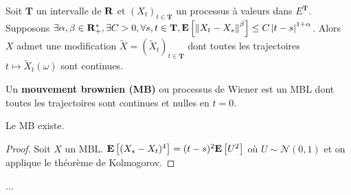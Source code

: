 	\begin{thm}[Kolmogorov]
		Soit $\mathbf{T}$ un intervalle de $\mathbf{R}$ et $(X_t)_{t \in \mathbf{T}}$ un processus à valeurs dans $E^{\mathbf{T}}$.
		Supposons $\exists \alpha,\beta \in \mathbf{R}_+^*, \exists C > 0, \forall s,t \in \mathbf{T}, \mathbf{E} \left[ \left\lVert X_t - X_s\right\rVert^\beta \right] \leq C \left\lvert t - s\right\rvert^{1 + \alpha}$.
		Alors $X$ admet une modification $\tilde{X} = \left( \tilde{X}_t \right)_{t \in \mathbf{T}}$ dont toutes les trajectoires $t \mapsto \tilde{X}_t(\omega)$ sont continues.
	\end{thm}
	
	\begin{defn}
		Un \textbf{mouvement brownien (MB)} ou processus de Wiener est un MBL dont toutes les trajectoires sont continues et nulles en $t = 0$.
	\end{defn}
	
	\begin{pop}
		Le MB existe.
	\end{pop}
	
	\begin{proof}
		Soit $X$ un MBL.
		$\mathbf{E} \left[ (X_s - X_t)^4 \right] = (t - s)^2 \mathbf{E} \left[ U^2 \right]$ où $U \sim \mathcal{N}(0,1)$ et on applique le théorème de Kolmogorov.
	\end{proof}
	
	...